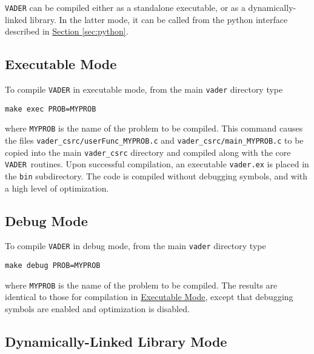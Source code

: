 \documentclass[12pt]{article}
\newcommand{\vader}{\texttt{VADER}}
\begin{document}
\texttt{VADER} can be compiled either as a standalone executable, or as a dynamically-linked library. In the latter mode, it can be called from the python interface described in \hyperref[sec:python]{Section \ref{sec:python}}.

\subsection{Executable Mode}
\label{ssec:exemode}

To compile \texttt{VADER} in executable mode, from the main \texttt{vader} directory type
\begin{verbatim}
make exec PROB=MYPROB
\end{verbatim}
where \verb=MYPROB= is the name of the problem to be compiled. This command causes the files \verb=vader_csrc/userFunc_MYPROB.c= and \verb=vader_csrc/main_MYPROB.c= to be copied into the main \verb=vader_csrc= directory and compiled along with the core \vader\ routines. Upon successful compilation, an executable \verb=vader.ex= is placed in the \verb=bin= subdirectory. The code is compiled without debugging symbols, and with a high level of optimization.

\subsection{Debug Mode}
\label{ssec:debugmode}

To compile \texttt{VADER} in debug mode, from the main \texttt{vader} directory type
\begin{verbatim}
make debug PROB=MYPROB
\end{verbatim}
where \verb=MYPROB= is the name of the problem to be compiled. The results are identical to those for compilation in \hyperref[ssec:exemode]{Executable Mode}, except that debugging symbols are enabled and optimization is disabled.

\subsection{Dynamically-Linked Library Mode}
\label{ssec:dylibmode}
\end{document}
